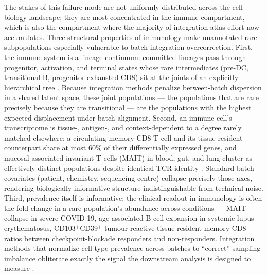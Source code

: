 
The stakes of this failure mode are not uniformly distributed across
the cell-biology landscape; they are most concentrated in the immune
compartment, which is also the compartment where the majority of
integration-atlas effort now accumulates. Three structural properties
of immunology make unannotated rare subpopulations especially
vulnerable to batch-integration overcorrection. First, the immune
system is a lineage continuum: committed lineages pass through
progenitor, activation, and terminal states whose rare intermediates
(pre-DC, transitional B, progenitor-exhausted CD8) sit at the joints
of an explicitly hierarchical tree \citep{villani2017single,
cancro2020abcs}. Because integration methods penalize between-batch
dispersion in a shared latent space, these joint populations --- the
populations that are rare precisely because they are transitional ---
are the populations with the highest expected displacement under
batch alignment. Second, an immune cell's transcriptome is tissue-,
antigen-, and context-dependent to a degree rarely matched elsewhere:
a circulating memory CD8 T cell and its tissue-resident counterpart
share at most 60\% of their differentially expressed genes, and
mucosal-associated invariant T cells (MAIT) in blood, gut, and lung
cluster as effectively distinct populations despite identical TCR
identity \citep{provine2020mait, dominguez2022crosstissue}. Standard
batch covariates (patient, chemistry, sequencing centre) collapse
precisely those axes, rendering biologically informative structure
indistinguishable from technical noise. Third, prevalence itself is
informative: the clinical readout in immunology is often the fold
change in a rare population's abundance across conditions --- MAIT
collapse in severe COVID-19, age-associated B-cell expansion in
systemic lupus erythematosus, CD103$^+$CD39$^+$ tumour-reactive
tissue-resident memory CD8 ratios between checkpoint-blockade
responders and non-responders. Integration methods that normalize
cell-type prevalence across batches to ``correct'' sampling
imbalance obliterate exactly the signal the downstream analysis is
designed to measure \citep{duhen2018coexpression,
caushi2021transcriptional, vandamme2021depletion}.

